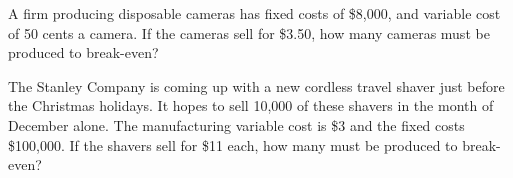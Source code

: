 \begin{puzzle}
    A firm producing disposable cameras has fixed costs of \$8,000, and variable cost of 50 cents a camera. If the cameras sell for \$3.50, how many cameras must be produced to break-even?
\end{puzzle}

\begin{puzzle}
    The Stanley Company is coming up with a new cordless travel shaver just before the Christmas holidays. It hopes to sell 10,000 of these shavers in the month of December alone. The manufacturing variable cost is \$3 and the fixed costs \$100,000. If the shavers sell for \$11 each, how many must be produced to break-even?
\end{puzzle}

